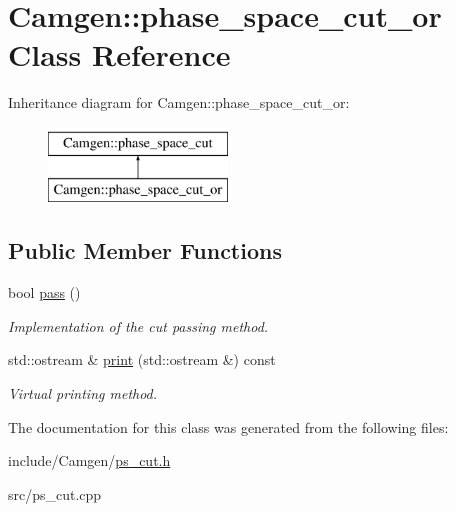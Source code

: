 \hypertarget{a00416}{\section{Camgen\-:\-:phase\-\_\-space\-\_\-cut\-\_\-or Class Reference}
\label{a00416}
}
Inheritance diagram for Camgen\-:\-:phase\-\_\-space\-\_\-cut\-\_\-or\-:\begin{figure}[H]
\begin{center}
\leavevmode
\includegraphics[height=2.000000cm]{a00416}
\end{center}
\end{figure}
\subsection*{Public Member Functions}
\begin{DoxyCompactItemize}
\item 
\hypertarget{a00416_a2ee4083a376cf1fdb0f904d4e9186cfe}{bool \hyperlink{a00416_a2ee4083a376cf1fdb0f904d4e9186cfe}{pass} ()}\label{a00416_a2ee4083a376cf1fdb0f904d4e9186cfe}

\begin{DoxyCompactList}\small\item\em Implementation of the cut passing method. \end{DoxyCompactList}\item 
\hypertarget{a00416_ac485366433b5eda88b2eebb41505e06e}{std\-::ostream \& \hyperlink{a00416_ac485366433b5eda88b2eebb41505e06e}{print} (std\-::ostream \&) const }\label{a00416_ac485366433b5eda88b2eebb41505e06e}

\begin{DoxyCompactList}\small\item\em Virtual printing method. \end{DoxyCompactList}\end{DoxyCompactItemize}


The documentation for this class was generated from the following files\-:\begin{DoxyCompactItemize}
\item 
include/\-Camgen/\hyperlink{a00713}{ps\-\_\-cut.\-h}\item 
src/ps\-\_\-cut.\-cpp\end{DoxyCompactItemize}

